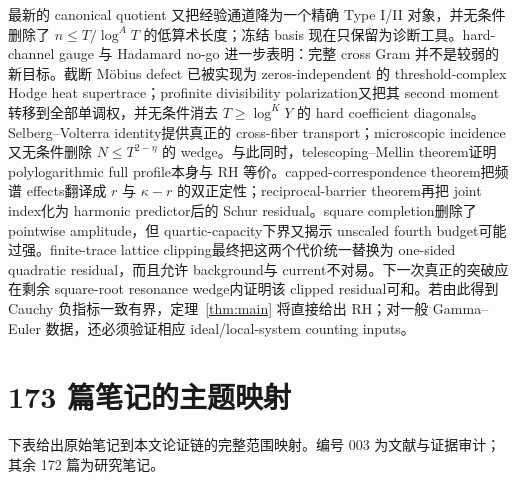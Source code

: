 \documentclass[UTF8,11pt,a4paper]{ctexart}
\theoremstyle{definition}
\theoremstyle{remark}
\newcommand{\1}{\mathbf 1}
\begin{document}
最新的 canonical quotient 又把经验通道降为一个精确 Type I/II 对象，并无条件删除了 $n\leq T/\log^A T$ 的低算术长度；冻结 basis 现在只保留为诊断工具。hard-channel gauge 与 Hadamard no-go 进一步表明：完整 cross Gram 并不是较弱的新目标。截断 M\"obius defect 已被实现为 zeros-independent 的 threshold-complex Hodge heat supertrace；profinite divisibility polarization又把其 second moment转移到全部单调权，并无条件消去 $T\geq\log^K Y$ 的 hard coefficient diagonals。Selberg--Volterra identity提供真正的 cross-fiber transport；microscopic incidence又无条件删除 $N\leq T^{2-\eta}$ 的 wedge。与此同时，telescoping--Mellin theorem证明 polylogarithmic full profile本身与 RH 等价。capped-correspondence theorem把频谱 effects翻译成 $r$ 与 $\kappa-r$ 的双正定性；reciprocal-barrier theorem再把 joint index化为 harmonic predictor后的 Schur residual。square completion删除了 pointwise amplitude，但 quartic-capacity下界又揭示 unscaled fourth budget可能过强。finite-trace lattice clipping最终把这两个代价统一替换为 one-sided quadratic residual，而且允许 background与 current不对易。下一次真正的突破应在剩余 square-root resonance wedge内证明该 clipped residual可和。若由此得到 Cauchy 负指标一致有界，定理~\ref{thm:main} 将直接给出 RH；对一般 Gamma--Euler 数据，还必须验证相应 ideal/local-system counting inputs。

\appendix
\section{173 篇笔记的主题映射}

下表给出原始笔记到本文论证链的完整范围映射。编号 003 为文献与证据审计；其余 172 篇为研究笔记。
\end{document}
